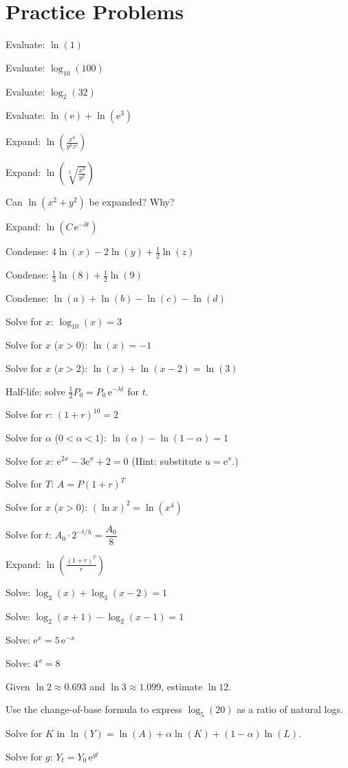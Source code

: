 \section{Practice Problems}

\begin{problems}
  \item Evaluate: $\ln(1)$
  \item Evaluate: $\log_{10}(100)$
  \item Evaluate: $\log_{2}(32)$
  \item Evaluate: $\ln(\mathrm{e})+\ln(\mathrm{e}^{3})$
  \item Expand: $\displaystyle\ln\left(\frac{x^{a}}{y^{b}z^{c}}\right)$
  \item Expand: $\displaystyle\ln\left(\sqrt[5]{\frac{x^{3}}{y^{2}}}\right)$
  \item Can $\ln(x^{2}+y^{2})$ be expanded? Why?
  \item Expand: $\ln(C\,\mathrm{e}^{-\delta t})$
  \item Condense: $4\ln(x)-2\ln(y)+\tfrac12\ln(z)$
  \item Condense: $\tfrac13\ln(8)+\tfrac12\ln(9)$
  \item Condense: $\ln(a)+\ln(b)-\ln(c)-\ln(d)$
  \item Solve for $x$: $\log_{10}(x)=3$
  \item Solve for $x$ ($x>0$): $\ln(x)=-1$
  \item Solve for $x$ ($x>2$): $\ln(x)+\ln(x-2)=\ln(3)$
  \item Half-life: solve $\tfrac12 P_{0}=P_{0}\,\mathrm{e}^{-\lambda t}$ for
        $t$.
  \item Solve for $r$: $(1+r)^{10}=2$
  \item Solve for $\alpha$ ($0<\alpha<1$): $\ln(\alpha)-\ln(1-\alpha)=1$
  \item Solve for $x$: $\mathrm{e}^{2x}-3\mathrm{e}^{x}+2=0$ (Hint:
        substitute $u=\mathrm{e}^{x}$.)
  \item Solve for $T$: $A=P(1+r)^{T}$
  \item Solve for $x$ ($x>0$): $(\ln x)^{2}=\ln(x^{4})$
  \item Solve for $t$: $A_{0}\cdot 2^{-t/h}=\dfrac{A_{0}}{8}$
  \item Expand: $\displaystyle\ln\left(\frac{(1+r)^{T}}{r}\right)$
  \item Solve: $\log_{3}(x)+\log_{3}(x-2)=1$
  \item Solve: $\log_{2}(x+1)-\log_{2}(x-1)=1$
  \item Solve: $\mathrm{e}^{x}=5\,\mathrm{e}^{-x}$
  \item Solve: $4^{x}=8$
  \item Given $\ln 2\approx 0.693$ and $\ln 3\approx 1.099$, estimate
        $\ln 12$.
  \item Use the change-of-base formula to express $\log_{5}(20)$ as a ratio
        of natural logs.
  \item Solve for $K$ in $\ln(Y)=\ln(A)+\alpha\ln(K)+(1-\alpha)\ln(L)$.
  \item Solve for $g$: $Y_{t}=Y_{0}\,\mathrm{e}^{gt}$
\end{problems}

